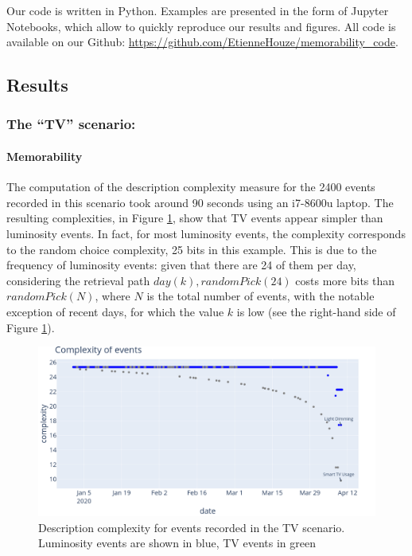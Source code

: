 \documentclass[entropy,article,submit,moreauthors,pdftex]{Definitions/mdpi}
\begin{document}
Our code is written in Python. Examples are presented in the form of Jupyter Notebooks, which allow to quickly reproduce our results and figures. All code is available on our Github: \url{https://github.com/EtienneHouze/memorability_code}.


\subsection{Results}
\label{sec:example}

\subsubsection{The ``TV'' scenario:}
\paragraph{Memorability}
The computation of the description complexity measure for the 2400 events recorded in this scenario took around 90 seconds using an i7-8600u laptop. The resulting complexities, in Figure \ref{fig:scenar1_complexity}, show that TV events appear simpler than luminosity events. In fact, for most luminosity events, the complexity corresponds to the random choice complexity, 25 bits in this example. This is due to the frequency of luminosity events: given that there are 24 of them per day, considering the retrieval path $day(k), randomPick(24)$ costs more bits than $randomPick(N)$, where $N$ is the total number of events, with the notable exception of recent days, for which the value $k$ is low (see the right-hand side of Figure \ref{fig:scenar1_complexity}).

\begin{figure}
    \centering
    \includegraphics[width=\linewidth]{figures/memorability_scenar_1.png}
    \caption{Description complexity for events recorded in the TV scenario. Luminosity events are shown in blue, TV events in green}
    \label{fig:scenar1_complexity}
\end{figure}
\end{document}
